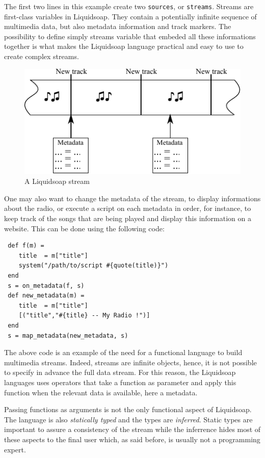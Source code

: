 \documentclass{llncs}
\newcommand{\liquidsoap}{Liquidsoap}
\begin{document}
The first two lines in this example create two \texttt{sources}, or \texttt{streams}. Streams are 
first-class variables in \liquidsoap{}. They contain a potentially infinite sequence of multimedia 
data, but also metadata information and track markers. The possibility to define simply streams 
variable that embeded all these informations together is what makes the \liquidsoap{} language 
practical and easy to use to create complex streams.

\begin{figure}[htn]
 \begin{center}
\includegraphics{stream}
\end{center}
 \caption{A \liquidsoap{} stream}
\end{figure}

One may also want to change the metadata of the stream,
to display informations about the radio, or execute a script on each metadata 
in order, for instance, to keep track of the songs that are being played and 
display this information on a website. This can be done using the following code:
\begin{verbatim}
 def f(m) = 
    title  = m["title"]
    system("/path/to/script #{quote(title)}")
 end
 s = on_metadata(f, s)
 def new_metadata(m) = 
    title  = m["title"]
    [("title","#{title} -- My Radio !")]
 end
 s = map_metadata(new_metadata, s)
\end{verbatim}
The above code is an example of the need for a functional language to build multimedia 
streams. Indeed, streams are infinite objects, hence, it is not possible to specify in advance
the full data stream. For this reason, the \liquidsoap{} languages uses operators that take 
a function as parameter and apply this function when the relevant data is available, here 
a metadata.

Passing functions as arguments is not the only functional aspect of \liquidsoap{}. The language is 
also \textit{statically typed} and the types are \textit{inferred}. Static types are important to 
assure a consistency of the stream while the inferrence hides most of these aspects to 
the final user which, as said before, is usually not a programming expert.
\end{document}
